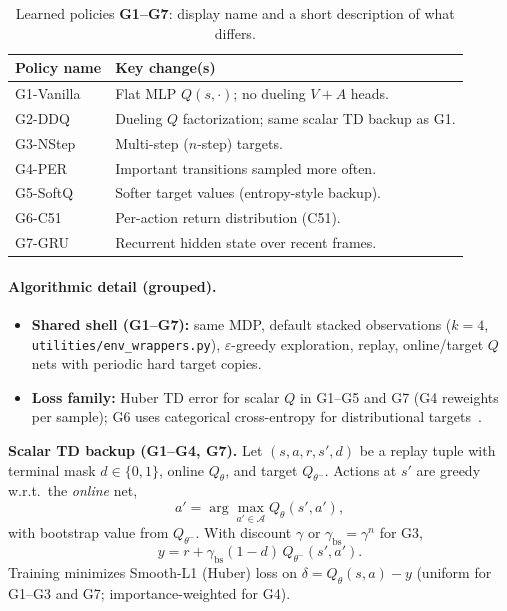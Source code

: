 \documentclass[letterpaper]{article}
\begin{document}
\begin{table}[H]
\centering
\small
\setlength{\tabcolsep}{6pt}
\caption{Learned policies \textbf{G1--G7}: display name and a short description of what differs.}
\label{tab:learned_g}
\begin{tabular}{@{}>{\raggedright\arraybackslash}p{1.9cm}>{\raggedright\arraybackslash}p{\dimexpr\columnwidth-1.9cm-2\tabcolsep}@{}}
\toprule
\textbf{Policy name} & \textbf{Key change(s)} \\
\midrule
G1-Vanilla & Flat MLP $Q(s,\cdot)$; no dueling $V{+}A$ heads. \\
G2-DDQ & Dueling $Q$ factorization; same scalar TD backup as G1. \\
G3-NStep & Multi-step ($n$-step) targets. \\
G4-PER & Important transitions sampled more often. \\
G5-SoftQ & Softer target values (entropy-style backup). \\
G6-C51 & Per-action return distribution (C51). \\
G7-GRU & Recurrent hidden state over recent frames. \\
\bottomrule
\end{tabular}
\end{table}

\paragraph{Algorithmic detail (grouped).}
\begin{itemize}[leftmargin=1.2em]
    \item \textbf{Shared shell (G1--G7):} same MDP, default stacked observations ($k{=}4$, \texttt{utilities/env\_wrappers.py}), $\varepsilon$-greedy exploration, replay, online/target $Q$ nets with periodic hard target copies.
    \item \textbf{Loss family:} Huber TD error for scalar $Q$ in G1--G5 and G7 (G4 reweights per sample); G6 uses categorical cross-entropy for distributional targets~\cite{bellemare2017distributional}.
\end{itemize}

\noindent\textbf{Scalar TD backup (G1--G4, G7).}
Let $(s,a,r,s',d)$ be a replay tuple with terminal mask $d\in\{0,1\}$, online $Q_\theta$, and target $Q_{\theta^-}$. Actions at $s'$ are greedy w.r.t.\ the \emph{online} net,
\[
a'=\arg\max_{a'\in\mathcal{A}} Q_\theta(s',a'),
\]
with bootstrap value from $Q_{\theta^-}$. With discount $\gamma$ or $\gamma_{\mathrm{bs}}=\gamma^{n}$ for G3,
\begin{equation}
y = r + \gamma_{\mathrm{bs}}(1-d)\,Q_{\theta^-}(s',a').
\label{eq:scalar_td_target}
\end{equation}
Training minimizes Smooth-L1 (Huber) loss on $\delta=Q_\theta(s,a)-y$ (uniform for G1--G3 and G7; importance-weighted for G4).
\end{document}
